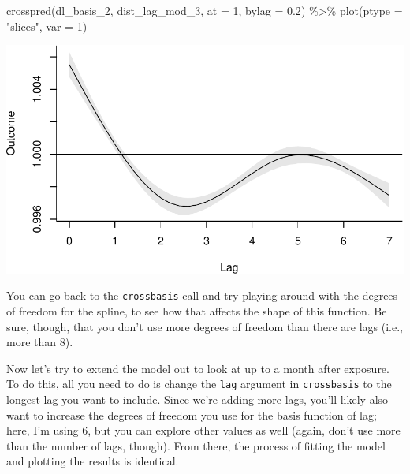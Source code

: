 \documentclass[
]{book}
\newenvironment{Shaded}{\begin{snugshade}}{\end{snugshade}}
\newcommand{\AttributeTok}[1]{\textcolor[rgb]{0.77,0.63,0.00}{#1}}
\newcommand{\DecValTok}[1]{\textcolor[rgb]{0.00,0.00,0.81}{#1}}
\newcommand{\FloatTok}[1]{\textcolor[rgb]{0.00,0.00,0.81}{#1}}
\newcommand{\FunctionTok}[1]{\textcolor[rgb]{0.00,0.00,0.00}{#1}}
\newcommand{\NormalTok}[1]{#1}
\newcommand{\SpecialCharTok}[1]{\textcolor[rgb]{0.00,0.00,0.00}{#1}}
\newcommand{\StringTok}[1]{\textcolor[rgb]{0.31,0.60,0.02}{#1}}
\begin{document}
\begin{Shaded}
\begin{Highlighting}[]
\FunctionTok{crosspred}\NormalTok{(dl\_basis\_2, dist\_lag\_mod\_3, }\AttributeTok{at =} \DecValTok{1}\NormalTok{, }\AttributeTok{bylag =} \FloatTok{0.2}\NormalTok{) }\SpecialCharTok{\%\textgreater{}\%} 
  \FunctionTok{plot}\NormalTok{(}\AttributeTok{ptype =} \StringTok{"slices"}\NormalTok{, }\AttributeTok{var =} \DecValTok{1}\NormalTok{)}
\end{Highlighting}
\end{Shaded}

\includegraphics{adv_epi_analysis_files/figure-latex/unnamed-chunk-100-1.pdf}

You can go back to the \texttt{crossbasis} call and try playing around with the degrees of freedom
for the spline, to see how that affects the shape of this function. Be sure, though, that
you don't use more degrees of freedom than there are lags (i.e., more than 8).

Now let's try to extend the model out to look at up to a month after exposure. To do this,
all you need to do is change the \texttt{lag} argument in \texttt{crossbasis} to the longest lag you
want to include. Since we're adding more lags, you'll likely also want to increase the
degrees of freedom you use for the basis function of lag; here, I'm using 6, but you can
explore other values as well (again, don't use more than the number of lags, though).
From there, the process of fitting the model and plotting the results is identical.
\end{document}
